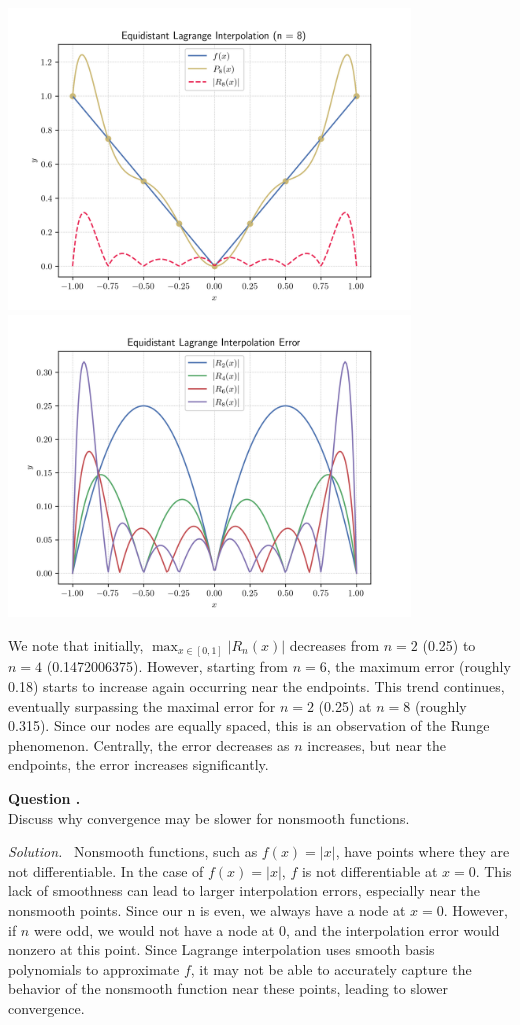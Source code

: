 \documentclass[12pt]{article}
\newcounter{question}
\newcounter{subquest}
\newcommand{\subquestion}{
    \stepcounter{subquest} 
    \vspace{.5em}
    \textbf{\large Question \thequestion.\thesubquest}
    \vspace{.25em}\ \\}
\newcommand{\solution}
    {\par\vspace{0.5em}\noindent\emph{Solution.}\ }
    {\par\vspace{1em}}
\begin{document}
\begin{center}
    \includegraphics[width=0.8\textwidth]{../plots_2/q4_3/p8.png}
    \includegraphics[width=0.8\textwidth]{../plots_2/q4_3/error.png}
\end{center}

We note that initially, $\max_{x \in [0,1]} |R_n(x)|$ decreases from $n=2$ (0.25) to $n=4$ (0.1472006375). However, starting from $n=6$, the maximum error (roughly 0.18) starts to increase again occurring near the endpoints. This trend continues, eventually surpassing the maximal error for $n=2$ (0.25) at $n=8$ (roughly 0.315). Since our nodes are equally spaced, this is an observation of the Runge phenomenon. Centrally, the error decreases as $n$ increases, but near the endpoints, the error increases significantly.

\newpage

\subquestion
Discuss why convergence may be slower for nonsmooth functions.

\solution
Nonsmooth functions, such as $f(x) = |x|$, have points where they are not differentiable. In the case of $f(x) = |x|$, $f$ is not differentiable at $x=0$. This lack of smoothness can lead to larger interpolation errors, especially near the nonsmooth points. Since our n is even, we always have a node at $x=0$. However, if $n$ were odd, we would not have a node at $0$, and the interpolation error would nonzero at this point. Since Lagrange interpolation uses smooth basis polynomials to approximate $f$, it may not be able to accurately capture the behavior of the nonsmooth function near these points, leading to slower convergence.
\end{document}
